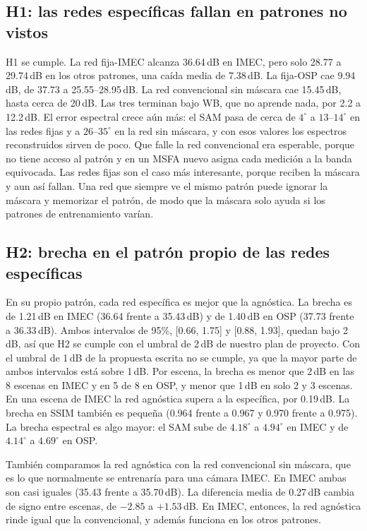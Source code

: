 \documentclass{article}
\begin{document}
\subsection{H1: las redes específicas fallan en patrones no vistos}

H1 se cumple. La red fija-IMEC alcanza 36.64\,dB en IMEC, pero solo 28.77 a
29.74\,dB en los otros patrones, una caída media de 7.38\,dB. La fija-OSP
cae 9.94\,dB, de 37.73 a 25.55--28.95\,dB. La red convencional sin máscara
cae 15.45\,dB, hasta cerca de 20\,dB. Las tres terminan bajo WB, que no
aprende nada, por 2.2 a 12.2\,dB. El error espectral crece aún más: el SAM
pasa de cerca de $4^\circ$ a $13$--$14^\circ$ en las redes fijas y a
$26$--$35^\circ$ en la red sin máscara, y con esos valores los espectros
reconstruidos sirven de poco. Que falle la red convencional era esperable,
porque no tiene acceso al patrón y en un MSFA nuevo asigna cada medición a
la banda equivocada. Las redes fijas son el caso más interesante, porque
reciben la máscara y aun así fallan. Una red que siempre ve el mismo patrón
puede ignorar la máscara y memorizar el patrón, de modo que la máscara solo
ayuda si los patrones de entrenamiento varían.

\subsection{H2: brecha en el patrón propio de las redes específicas}

En su propio patrón, cada red específica es mejor que la agnóstica. La
brecha es de 1.21\,dB en IMEC (36.64 frente a 35.43\,dB) y de 1.40\,dB en
OSP (37.73 frente a 36.33\,dB). Ambos intervalos de 95\%, [0.66, 1.75] y
[0.88, 1.93], quedan bajo 2\,dB, así que H2 se cumple con el umbral de
2\,dB de nuestro plan de proyecto. Con el umbral de 1\,dB de la propuesta
escrita no se cumple, ya que la mayor parte de ambos intervalos está sobre
1\,dB. Por escena, la brecha es menor que 2\,dB en las 8 escenas en IMEC y
en 5 de 8 en OSP, y menor que 1\,dB en solo 2 y 3 escenas. En una escena de
IMEC la red agnóstica supera a la específica, por 0.19\,dB. La brecha en
SSIM también es pequeña (0.964 frente a 0.967 y 0.970 frente a 0.975). La
brecha espectral es algo mayor: el SAM sube de $4.18^\circ$ a $4.94^\circ$
en IMEC y de $4.14^\circ$ a $4.69^\circ$ en OSP.

También comparamos la red agnóstica con la red convencional sin máscara, que
es lo que normalmente se entrenaría para una cámara IMEC. En IMEC ambas son
casi iguales (35.43 frente a 35.70\,dB). La diferencia media de 0.27\,dB
cambia de signo entre escenas, de $-2.85$ a $+1.53$\,dB. En IMEC, entonces,
la red agnóstica rinde igual que la convencional, y además funciona en los
otros patrones.
\end{document}
